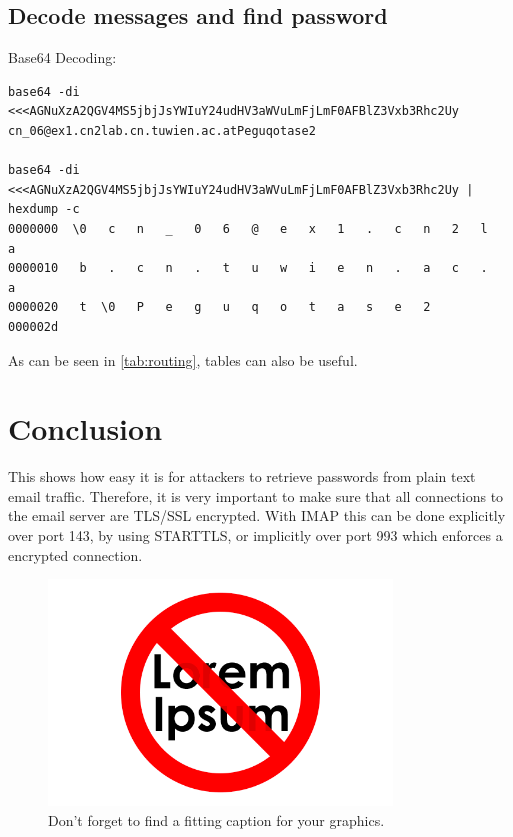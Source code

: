 \documentclass[parskip=full]{scrartcl}
\begin{document}
\subsection{Decode messages and find password}

Base64 Decoding:
\begin{verbatim}
base64 -di <<<AGNuXzA2QGV4MS5jbjJsYWIuY24udHV3aWVuLmFjLmF0AFBlZ3Vxb3Rhc2Uy
cn_06@ex1.cn2lab.cn.tuwien.ac.atPeguqotase2

base64 -di <<<AGNuXzA2QGV4MS5jbjJsYWIuY24udHV3aWVuLmFjLmF0AFBlZ3Vxb3Rhc2Uy | hexdump -c
0000000  \0   c   n   _   0   6   @   e   x   1   .   c   n   2   l   a
0000010   b   .   c   n   .   t   u   w   i   e   n   .   a   c   .   a
0000020   t  \0   P   e   g   u   q   o   t   a   s   e   2            
000002d
\end{verbatim}



As can be seen in \cref{tab:routing}, tables can also be useful.
\section{Conclusion}

This shows how easy it is for attackers to retrieve passwords from plain text email traffic. Therefore, it is very important to make sure that all connections to the email server are TLS/SSL encrypted. With IMAP this can be done explicitly over port 143, by using STARTTLS, or implicitly over port 993 which enforces a encrypted connection.

\begin{figure}[ht]
 \centering %
 \includegraphics[height=6cm]{images/loremipsum.png} %
 \caption{Don't forget to find a fitting caption for your graphics.} 
 \label{fig:lorem} %
\end{figure} 
\end{document}

